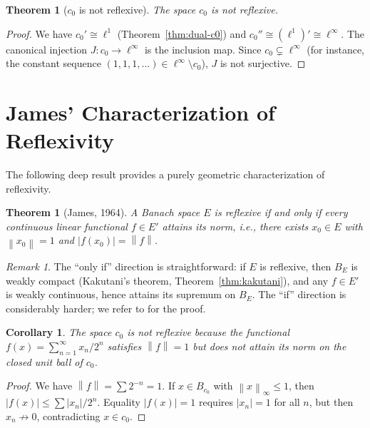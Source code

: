 \documentclass[a4paper,12pt]{book}
\newcommand{\norm}[1]{\left\| #1 \right\|}
\theoremstyle{definition}
\theoremstyle{plain}
\newtheorem{theorem}[definition]{Theorem}
\newtheorem{corollary}[definition]{Corollary}
\theoremstyle{remark}
\newtheorem{remark}[definition]{Remark}
\begin{document}
\begin{theorem}[$c_0$ is not reflexive]\label{thm:c0-not-reflexive}
The space $c_0$ is not reflexive.
\end{theorem}

\begin{proof}
We have $c_0' \cong \ell^1$ (Theorem~\ref{thm:dual-c0}) and
$c_0'' \cong (\ell^1)' \cong \ell^\infty$.  The canonical injection
$J:c_0\to\ell^\infty$ is the inclusion map.  Since $c_0\subsetneq\ell^\infty$
(for instance, the constant sequence $(1,1,1,\ldots)\in\ell^\infty\setminus c_0$),
$J$ is not surjective.
\end{proof}

\section{James' Characterization of Reflexivity}\label{sec:james-char}

The following deep result provides a purely geometric characterization of
reflexivity.

\begin{theorem}[{James, 1964}]\label{thm:james}
A Banach space $E$ is reflexive if and only if every continuous linear
functional $f\in E'$ attains its norm, i.e., there exists $x_0\in E$ with
$\norm{x_0}=1$ and $|f(x_0)|=\norm{f}$.
\end{theorem}

\begin{remark}
The ``only if'' direction is straightforward: if $E$ is reflexive, then $B_E$
is weakly compact (Kakutani's theorem, Theorem~\ref{thm:kakutani}), and any
$f\in E'$ is weakly continuous, hence attains its supremum on $B_E$.
The ``if'' direction is considerably harder; we refer to
\cite{James1964} for the proof.
\end{remark}

\begin{corollary}\label{cor:james-c0}
The space $c_0$ is not reflexive because the functional
$f(x) = \sum_{n=1}^\infty x_n/2^n$ satisfies $\norm{f}=1$ but does not
attain its norm on the closed unit ball of $c_0$.
\end{corollary}

\begin{proof}
We have $\norm{f} = \sum 2^{-n} = 1$.  If $x\in B_{c_0}$ with $\norm{x}_\infty\le 1$,
then $|f(x)|\le\sum |x_n|/2^n$.  Equality $|f(x)|=1$ requires $|x_n|=1$ for
all $n$, but then $x_n\not\to 0$, contradicting $x\in c_0$.
\end{proof}
\end{document}
